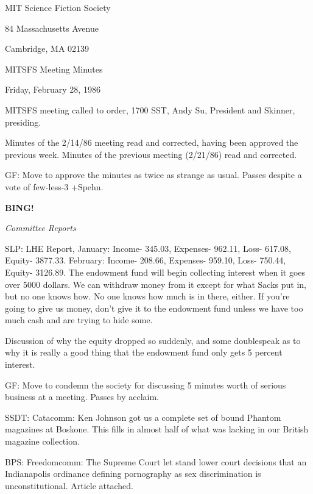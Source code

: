 \documentclass[12pt]{article}
\newcommand{\bing}{{\bf BING!} }
\newcommand{\goto}[1]{\bing \vskip 12pt \centerline{{\em{#1}}}}
\begin{document}
\begin{center}

MIT Science Fiction Society 

84 Massachusetts Avenue

Cambridge, MA 02139

\vspace{12pt}

MITSFS Meeting Minutes 

Friday, February 28, 1986

\end{center}
 
\vspace{18pt}

\setlength{\parskip}{6pt}

\noindent
MITSFS meeting called to order, 1700 SST,
Andy Su, President and Skinner, presiding.

Minutes of the 2/14/86 meeting read and corrected, having been approved the previous week. Minutes of the previous meeting (2/21/86) read and corrected.

GF: Move to approve the minutes as twice as strange as usual. Passes despite a vote of few-less-3 +Spehn.

\goto{Committee Reports}

SLP: LHE Report, January: Income- 345.03, Expenses- 962.11, Loss- 617.08, Equity- 3877.33. February: Income- 208.66, Expenses- 959.10, Loss- 750.44, Equity- 3126.89. The endowment fund will begin collecting interest when it goes over 5000 dollars. We can withdraw money from it except for what Sacks put in, but no one knows how. No one knows how much is in there, either. If you're going to give us money, don't give it to the endowment fund unless we have too much cash and are trying to hide some.

Discussion of why the equity dropped so suddenly, and some doublespeak as to why it is really a good thing that the endowment fund only gets 5 percent interest.

GF: Move to condemn the society for discussing 5 minutes worth of serious business at a meeting. Passes by acclaim.

SSDT: Catacomm: Ken Johnson got us a complete set of bound Phantom magazines at Boskone. This fills in almost half of what was lacking in our British magazine collection.

BPS: Freedomcomm: The Supreme Court let stand lower court decisions that an Indianapolis ordinance defining pornography as sex discrimination is unconstitutional. Article attached.
\end{document}
